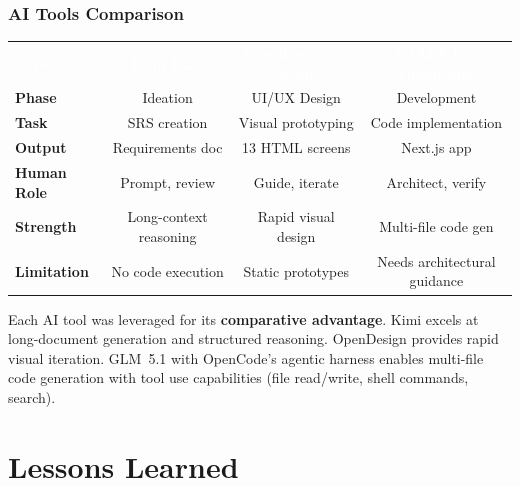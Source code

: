 \documentclass[aspectratio=169,professionalfonts,10pt]{beamer}
\begin{document}
\begin{frame}
    \frametitle{AI Tools Comparison}
    \small
    \begin{table}
        \centering\scriptsize
        \begin{tabular}{lccc}
            \rowcolor{ugmBlue!40}
            \textcolor{white}{\textbf{Aspect}} & \textcolor{white}{\textbf{Kimi K2.6}} & \textcolor{white}{\textbf{OpenDesign + Kimi}} & \textcolor{white}{\textbf{GLM 5.1 + OpenCode}} \\
            \textbf{Phase} & Ideation & UI/UX Design & Development \\
            \textbf{Task} & SRS creation & Visual prototyping & Code implementation \\
            \textbf{Output} & Requirements doc & 13 HTML screens & Next.js app \\
            \textbf{Human Role} & Prompt, review & Guide, iterate & Architect, verify \\
            \textbf{Strength} & Long-context reasoning & Rapid visual design & Multi-file code gen \\
            \textbf{Limitation} & No code execution & Static prototypes & Needs architectural guidance \\
        \end{tabular}
    \end{table}

    \vspace{0.3em}
    \begin{tcolorbox}[colback=ugmLightGrey,colframe=ugmBlue,title=\small Key Insight]
        \scriptsize
        Each AI tool was leveraged for its \textbf{comparative advantage}. Kimi excels at long-document generation and structured reasoning. OpenDesign provides rapid visual iteration. GLM~5.1 with OpenCode's agentic harness enables multi-file code generation with tool use capabilities (file read/write, shell commands, search).
    \end{tcolorbox}
\end{frame}

\section{Lessons Learned}
\end{document}
